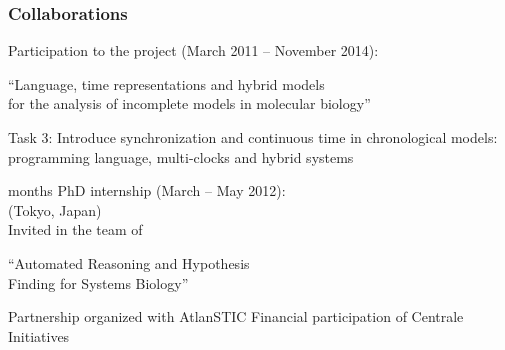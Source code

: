 \begin{frame}[c]
  \frametitle{Collaborations}

Participation to the  project  (March 2011 -- November 2014):
\begin{center}
“Language, time representations and hybrid models\\
for the analysis of incomplete models in molecular biology”
\end{center}
Task 3: Introduce synchronization and continuous time in chronological models:\\
programming language, multi-clocks and hybrid systems

\bigskip
{} months PhD internship (March -- May 2012):\\
 (Tokyo, Japan)\\
Invited in the team of 
\begin{center}
“Automated Reasoning and Hypothesis\\
Finding for Systems Biology”
\end{center}
Partnership organized with AtlanSTIC
Financial participation of Centrale Initiatives 







\end{frame}
